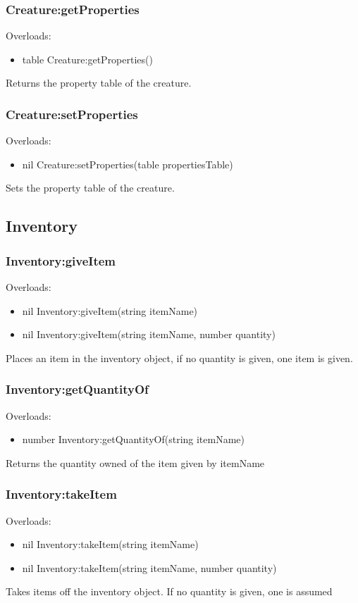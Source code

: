\documentclass{book}
\newenvironment{ulist}
	{\begin{itemize}
			\itemsep0em}
	{\end{itemize}}
\begin{document}
\subsubsection{Creature:getProperties}
Overloads:
\begin{ulist}
	\item table Creature:getProperties()
\end{ulist}
Returns the property table of the creature.

\subsubsection{Creature:setProperties}
Overloads:
\begin{ulist}
	\item nil Creature:setProperties(table propertiesTable)
\end{ulist}
Sets the property table of the creature.

\subsection{Inventory}
\subsubsection{Inventory:giveItem}
Overloads:
\begin{ulist}
	\item nil Inventory:giveItem(string itemName)
	\item nil Inventory:giveItem(string itemName, number quantity)
\end{ulist}
Places an item in the inventory object, if no quantity is given, one item is given.

\subsubsection{Inventory:getQuantityOf}
Overloads:
\begin{ulist}
	\item number Inventory:getQuantityOf(string itemName)
\end{ulist}
Returns the quantity owned of the item given by itemName

\subsubsection{Inventory:takeItem}
Overloads:
\begin{ulist}
	\item nil Inventory:takeItem(string itemName)
	\item nil Inventory:takeItem(string itemName, number quantity)
\end{ulist}
Takes items off the inventory object. If no quantity is given, one is assumed
\end{document}
